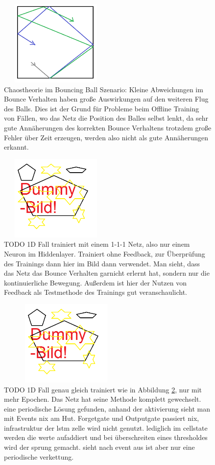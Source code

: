 \begin{figure}
	\centering
	\includegraphics[width=0.5\textwidth, height=160px]{pics/chaos.png}	
	\caption{Chaostheorie im Bouncing Ball Szenario: Kleine Abweichungen im Bounce Verhalten haben große Auswirkungen auf den weiteren Flug des Balls. Dies ist der Grund für Probleme beim Offline Training von Fällen, wo das Netz die Position des Balles selbst lenkt, da sehr gute Annäherungen des korrekten Bounce Verhaltens trotzdem große Fehler über Zeit erzeugen, werden also nicht als gute Annäherungen erkannt.}
	\label{img:chaos}
\end{figure}
\begin{figure}
	\centering
	\includegraphics[width=0.5\textwidth, height=160px]{pics/dummy.png}	
	\caption{TODO 1D Fall trainiert mit einem 1-1-1 Netz, also nur einem Neuron im Hiddenlayer. Trainiert ohne Feedback, zur Überprüfung des Trainings dann hier im Bild dann verwendet. Man sieht, dass das Netz das Bounce Verhalten garnicht erlernt hat, sondern nur die kontinuierliche Bewegung. Außerdem ist hier der Nutzen von Feedback als Testmethode des Trainings gut veranschaulicht.}
	 \label{img:1d1}
\end{figure}
\begin{figure}
	\centering
	\includegraphics[width=0.6\textwidth, height=160px]{pics/dummy.png}	
	\caption{TODO 1D Fall genau gleich trainiert wie in Abbildung \ref{img:1d1}, nur mit mehr Epochen. Das Netz hat seine Methode komplett gewechselt. eine periodische Lösung gefunden, anhand der aktivierung sieht man mit Events nix am Hut. Forgetgate und Outputgate passiert nix, infrastruktur der lstm zelle wird nicht genutzt. lediglich im cellstate werden die werte aufaddiert und bei überschreiten eines thresholdes wird der sprung gemacht. sieht nach event aus ist aber nur eine periodische verkettung.}
	\label{img:1d2}
\end{figure}
